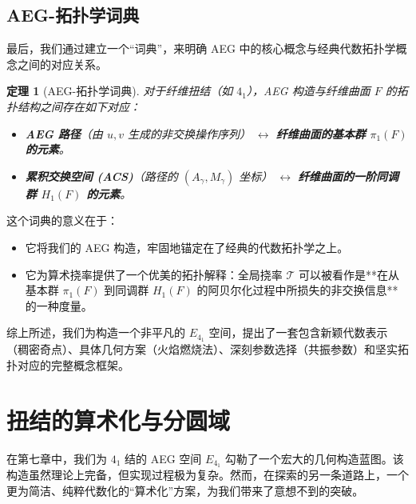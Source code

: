 \documentclass[a4paper,12pt]{book}
\numberwithin{problem}{section}
\numberwithin{definition}{section}
\numberwithin{lemma}{section}
\numberwithin{proposition}{section}
\newtheorem{theorem}{定理}
\numberwithin{theorem}{section}
\numberwithin{grammar}{section}
\numberwithin{program}{section}
\numberwithin{convention}{section}
\numberwithin{corollary}{section}
\begin{document}
\section{AEG-拓扑学词典}
\label{sec:e41_dictionary}

最后，我们通过建立一个“词典”，来明确 AEG 中的核心概念与经典代数拓扑学概念之间的对应关系。

\begin{theorem}[AEG-拓扑学词典]
    \label{thm:aeg_topology_dictionary}
    对于纤维扭结（如 $4_1$），AEG 构造与纤维曲面 $F$ 的拓扑结构之间存在如下对应：
    \begin{itemize}
        \item \textbf{AEG 路径}（由 $u,v$ 生成的非交换操作序列） $\longleftrightarrow$ \textbf{纤维曲面的基本群 $\pi_1(F)$ 的元素}。
        \item \textbf{累积交换空间 (ACS)}（路径的 $(A_\gamma, M_\gamma)$ 坐标） $\longleftrightarrow$ \textbf{纤维曲面的一阶同调群 $H_1(F)$ 的元素}。
    \end{itemize}
\end{theorem}
这个词典的意义在于：
\begin{itemize}
    \item 它将我们的 AEG 构造，牢固地锚定在了经典的代数拓扑学之上。
    \item 它为算术挠率提供了一个优美的拓扑解释：全局挠率 $\mathcal{T}$ 可以被看作是**在从基本群 $\pi_1(F)$ 到同调群 $H_1(F)$ 的阿贝尔化过程中所损失的非交换信息**的一种度量。
\end{itemize}

综上所述，我们为构造一个非平凡的 $E_{4_1}$ 空间，提出了一套包含新颖代数表示（稠密奇点）、具体几何方案（火焰燃烧法）、深刻参数选择（共振参数）和坚实拓扑对应的完整概念框架。


\chapter{扭结的算术化与分圆域}
\label{chap:knots_and_cyclotomic_fields}

在第七章中，我们为 $4_1$ 结的 AEG 空间 $E_{4_1}$ 勾勒了一个宏大的几何构造蓝图。该构造虽然理论上完备，但实现过程极为复杂。然而，在探索的另一条道路上，一个更为简洁、纯粹代数化的“算术化”方案，为我们带来了意想不到的突破。
\end{document}

